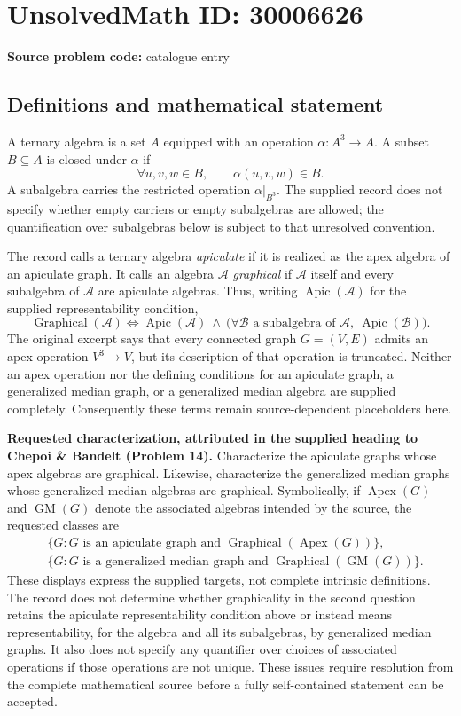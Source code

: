 \documentclass[11pt]{article}
\begin{document}
\section*{UnsolvedMath ID: 30006626}
\textbf{Source problem code:} catalogue entry
\subsection{Definitions and mathematical statement}
A ternary algebra is a set \(A\) equipped with an operation \(\alpha\colon A^3\to A\). A subset \(B\subseteq A\) is closed under \(\alpha\) if
\[
\forall u,v,w\in B,\qquad \alpha(u,v,w)\in B.
\]
A subalgebra carries the restricted operation \(\alpha|_{B^3}\). The supplied record does not specify whether empty carriers or empty subalgebras are allowed; the quantification over subalgebras below is subject to that unresolved convention.

The record calls a ternary algebra \emph{apiculate} if it is realized as the apex algebra of an apiculate graph. It calls an algebra \(\mathcal A\) \emph{graphical} if \(\mathcal A\) itself and every subalgebra of \(\mathcal A\) are apiculate algebras. Thus, writing \(\operatorname{Apic}(\mathcal A)\) for the supplied representability condition,
\[
\operatorname{Graphical}(\mathcal A)
\iff
\operatorname{Apic}(\mathcal A)
\ \land\
\bigl(\forall\mathcal B\text{ a subalgebra of }\mathcal A,\ 
\operatorname{Apic}(\mathcal B)\bigr).
\]
The original excerpt says that every connected graph \(G=(V,E)\) admits an apex operation \(V^3\to V\), but its description of that operation is truncated. Neither an apex operation nor the defining conditions for an apiculate graph, a generalized median graph, or a generalized median algebra are supplied completely. Consequently these terms remain source-dependent placeholders here.

\textbf{Requested characterization, attributed in the supplied heading to Chepoi \& Bandelt (Problem 14).} Characterize the apiculate graphs whose apex algebras are graphical. Likewise, characterize the generalized median graphs whose generalized median algebras are graphical. Symbolically, if \(\operatorname{Apex}(G)\) and \(\operatorname{GM}(G)\) denote the associated algebras intended by the source, the requested classes are
\[
\begin{aligned}
&\{G: G\text{ is an apiculate graph and }
\operatorname{Graphical}(\operatorname{Apex}(G))\},\\
&\{G: G\text{ is a generalized median graph and }
\operatorname{Graphical}(\operatorname{GM}(G))\}.
\end{aligned}
\]
These displays express the supplied targets, not complete intrinsic definitions. The record does not determine whether graphicality in the second question retains the apiculate representability condition above or instead means representability, for the algebra and all its subalgebras, by generalized median graphs. It also does not specify any quantifier over choices of associated operations if those operations are not unique. These issues require resolution from the complete mathematical source before a fully self-contained statement can be accepted.
\end{document}

